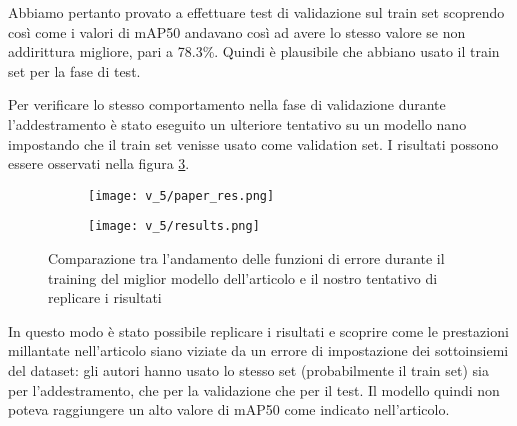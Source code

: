 Abbiamo pertanto provato a effettuare test di validazione sul train set scoprendo così
come i valori di mAP50 andavano così ad avere lo stesso valore se non addirittura
migliore, pari a 78.3\%. Quindi è plausibile che abbiano usato il train set per la fase di test.

Per verificare lo stesso comportamento nella fase di validazione durante l'addestramento
è stato eseguito un ulteriore tentativo su un modello nano impostando che il train set venisse usato
come validation set. I risultati possono essere osservati nella figura \ref{fig:v5-4}.

    \begin{figure}[!htb]
        \centering
        \begin{subfigure}{.8\textwidth}
            \texttt{[image: v\_5/paper\_res.png]}
            \label{fig:v5-4.1}
        \end{subfigure}
        \begin{subfigure}{.8\textwidth}
            \texttt{[image: v\_5/results.png]}
            \label{fig:v5-4.2}
        \end{subfigure}
        \caption{Comparazione tra l'andamento delle funzioni di errore durante il training
        del miglior modello dell'articolo e il nostro tentativo di replicare i risultati}
        \label{fig:v5-4}
    \end{figure}

In questo modo è stato possibile replicare i risultati e scoprire come le prestazioni
millantate nell'articolo siano viziate da un errore di impostazione dei sottoinsiemi
del dataset: gli autori hanno usato lo stesso set (probabilmente il train set)
sia per l'addestramento, che per la validazione che per il test. 
Il modello quindi non poteva raggiungere un alto valore di mAP50 
come indicato nell'articolo.

